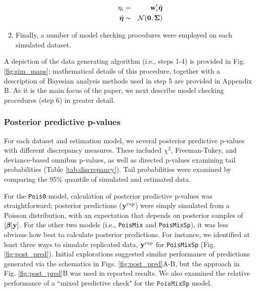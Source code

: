 \documentclass[12pt,english]{article}
\begin{document}
\begin{spacing}{1.9}
\begin{enumerate}
\begin{itemize}
\begin{eqnarray*}
      \eta_i & = & {\bf w}_i^\prime \tilde{\boldsymbol{\eta}} \\
      \tilde{\boldsymbol{\eta}} & \sim & \mathcal{N}(\textbf{0},\boldsymbol{\Sigma}) \\
    \end{eqnarray*}
  \end{itemize}
\item Finally, a number of model checking procedures were employed on
  each simulated dataset.
\end{enumerate}
A depiction of the data generating algorithm (i.e., steps 1-4) is
provided in Fig. \ref{fig:sim_maps}; mathematical details of this
procedure, together with a description of Bayesian analysis methods
used in step 5 are provided in Appendix B.  As it is the main focus of
the paper, we next describe model checking procedures (step 6) in
greater detail.

\subsubsection{Posterior predictive p-values}

For each dataset and estimation model, we several posterior predictive
p-values with different discrepancy measures.  These included
$\chi^2$, Freeman-Tukey, and deviance-based omnibus p-values, as well
as directed p-values examining tail probabilities (Table
\ref{tab:discrepancy}). Tail probabilities were examined by comparing
the 95\% quantile of simulated and estimated data.

For the \texttt{Pois0} model, calculation of posterior predictive
p-values was straightforward; posterior predictions (${\bf y}^{rep}$)
were simply simulated from a Poisson distribution, with an expectation
that depends on posterior samples of $[\boldsymbol{\beta}|{\bf y}]$.  For the other
two models (i.e., \texttt{PoisMix} and \texttt{PoisMixSp}), it was
less obvious how best to calculate posterior predictions.  For
instance, we identified at least three ways to simulate replicated
data, ${\bf y}^{rep}$ for \texttt{PoisMixSp} (Fig. \ref{fig:post_pred}).
Initial explorations suggested similar performance of predictions
generated via the schematics in Figs. \ref{fig:post_pred}A-B, but the
approach in Fig. \ref{fig:post_pred}B was used in reported results.
We also examined the relative performance of a ``mixed predictive
check" \citep[][;
Fig. \ref{fig:post_pred}C]{MarshallSpiegelhalter2007} for the
$\texttt{PoisMixSp}$ model.


\end{spacing}
\end{document}

